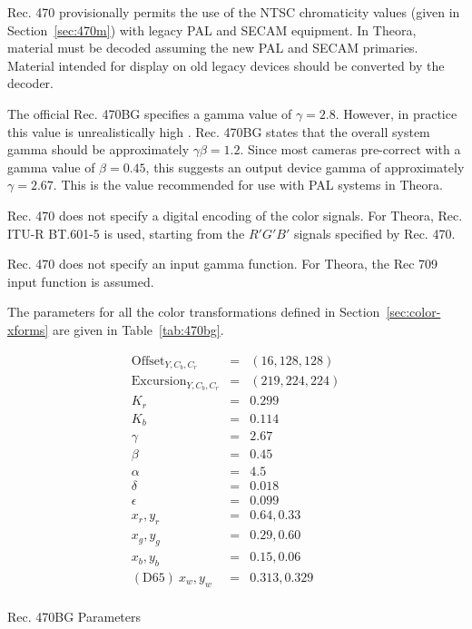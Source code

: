 \documentclass[11pt,letterpaper]{article}
\begin{document}
Rec. 470 provisionally permits the use of the NTSC chromaticity values (given
 in Section~\ref{sec:470m}) with legacy PAL and SECAM equipment.
In Theora, material must be decoded assuming the new PAL and SECAM primaries.
Material intended for display on old legacy devices should be converted by the
 decoder.

The official Rec. 470BG specifies a gamma value of $\gamma=2.8$.
However, in practice this value is unrealistically high \cite{Poyn97}.
Rec. 470BG states that the overall system gamma should be approximately
 $\gamma\beta=1.2$.
Since most cameras pre-correct with a gamma value of $\beta=0.45$,
 this suggests an output device gamma of approximately $\gamma=2.67$.
This is the value recommended for use with PAL systems in Theora.

Rec. 470 does not specify a digital encoding of the color signals.
For Theora, Rec. ITU-R BT.601-5 \cite{rec601} is used, starting from the
 $R'G'B'$ signals specified by Rec. 470.

Rec. 470 does not specify an input gamma function.
For Theora, the Rec 709 \cite{rec709} input function is assumed.

The parameters for all the color transformations defined in
 Section~\ref{sec:color-xforms} are given in Table~\ref{tab:470bg}.

\begin{table}[htb]
\begin{eqnarray*}
\mathrm{Offset}_{Y,C_b,C_r}    & = & (16, 128, 128)  \\
\mathrm{Excursion}_{Y,C_b,C_r} & = & (219, 224, 224) \\
K_r                            & = & 0.299           \\
K_b                            & = & 0.114           \\
\gamma                         & = & 2.67            \\
\beta                          & = & 0.45            \\
\alpha                         & = & 4.5             \\
\delta                         & = & 0.018           \\
\epsilon                       & = & 0.099           \\
x_r,y_r                        & = & 0.64, 0.33      \\
x_g,y_g                        & = & 0.29, 0.60      \\
x_b,y_b                        & = & 0.15, 0.06      \\
\mathrm{(D65)\ }x_w,y_w        & = & 0.313, 0.329    \\
\end{eqnarray*}
\caption{Rec. 470BG Parameters}
\label{tab:470bg}
\end{table}
\end{document}
